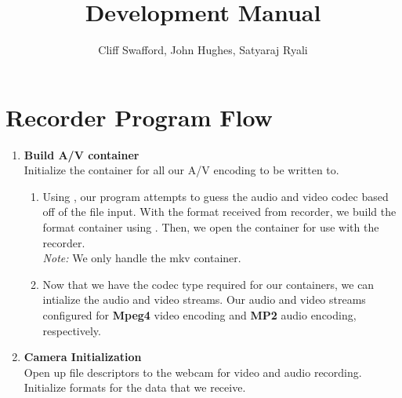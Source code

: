 \documentclass[a4paper]{article}
\title{Development Manual}
\begin{document}
\author{ Cliff Swafford, John Hughes, Satyaraj Ryali}
\maketitle
\section{Recorder Program Flow}
\begin{enumerate}
\item \textbf{Build A/V container}
	\\Initialize the container for all our A/V encoding to be written to.
	\begin{enumerate}
		\item Using , our program attempts to guess the audio and video codec based off of the file input. 				
				With the format received from recorder, we build the format container using . 
				Then, we open the container for use with the recorder. \\\textit{Note:} We only handle the mkv container.
		\item Now that we have the codec type required for our containers, we can intialize the audio and video streams. Our audio and video streams configured for \textbf{Mpeg4} video encoding and \textbf{MP2} audio encoding, respectively.
	\end{enumerate}
\item \textbf{Camera Initialization}
	\\Open up file descriptors to the webcam for video and audio recording. Initialize formats for the data that we receive.
\end{enumerate}
\end{document}
